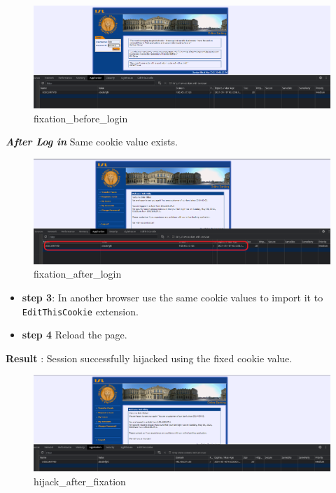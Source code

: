 \begin{figure}
\centering
\includegraphics{images/task2/fixation_before_login.PNG}
\caption{fixation\_before\_login}
\end{figure}

\textbf{\emph{After Log in}} Same cookie value exists.

\begin{figure}
\centering
\includegraphics{images/task2/fixation_after_login.png}
\caption{fixation\_after\_login}
\end{figure}

\begin{itemize}
\tightlist
\item
  \textbf{step 3}: In another browser use the same cookie values to
  import it to \texttt{EditThisCookie} extension.
\item
  \textbf{step 4} Reload the page.
\end{itemize}

\textbf{Result} : Session successfully hijacked using the fixed cookie
value.

\begin{figure}
\centering
\includegraphics{images/task2/hijack_after_fixation.PNG}
\caption{hijack\_after\_fixation}
\end{figure}

